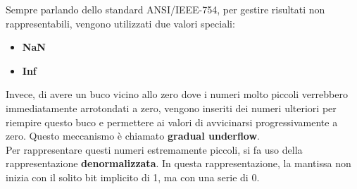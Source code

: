 \documentclass{article}
\numberwithin{equation}{section}
\begin{document}
Sempre parlando dello standard ANSI/IEEE-754, per gestire risultati non rappresentabili, 
vengono utilizzati due valori speciali:
\begin{itemize}
    \item \textbf{NaN} 
    \item \textbf{Inf}
\end{itemize}
Invece, di avere un buco vicino allo zero dove i numeri molto piccoli
verrebbero immediatamente arrotondati a zero, vengono inseriti dei numeri ulteriori per
riempire questo buco e permettere ai valori di avvicinarsi progressivamente a zero.
Questo meccanismo è chiamato \textbf{gradual underflow}.\\ 
Per rappresentare questi numeri estremamente piccoli, si fa uso della
rappresentazione \textbf{denormalizzata}. In questa rappresentazione, la
mantissa  non inizia con il solito bit implicito di 1, ma  con una serie di 0.
\end{document}
